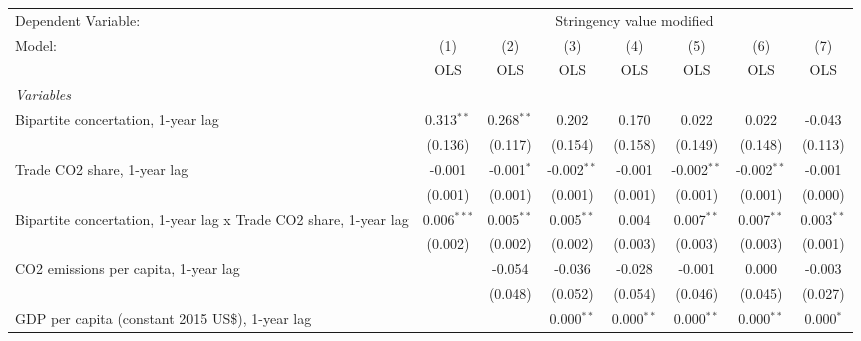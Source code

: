 
\begingroup
\centering
\begin{tabular}{lccccccc}
   \toprule
   Dependent Variable: & \multicolumn{7}{c}{Stringency value modified}\\
   Model:                                                           & (1)           & (2)          & (3)           & (4)          & (5)           & (6)           & (7)\\  
                                                                    &  OLS          & OLS          & OLS           & OLS          & OLS           & OLS           & OLS\\  
   \midrule
   \emph{Variables}\\
   Bipartite concertation, 1-year lag                               & 0.313$^{**}$  & 0.268$^{**}$ & 0.202         & 0.170        & 0.022         & 0.022         & -0.043\\   
                                                                    & (0.136)       & (0.117)      & (0.154)       & (0.158)      & (0.149)       & (0.148)       & (0.113)\\   
   Trade CO2 share, 1-year lag                                      & -0.001        & -0.001$^{*}$ & -0.002$^{**}$ & -0.001       & -0.002$^{**}$ & -0.002$^{**}$ & -0.001\\   
                                                                    & (0.001)       & (0.001)      & (0.001)       & (0.001)      & (0.001)       & (0.001)       & (0.000)\\   
   Bipartite concertation, 1-year lag x Trade CO2 share, 1-year lag & 0.006$^{***}$ & 0.005$^{**}$ & 0.005$^{**}$  & 0.004        & 0.007$^{**}$  & 0.007$^{**}$  & 0.003$^{**}$\\   
                                                                    & (0.002)       & (0.002)      & (0.002)       & (0.003)      & (0.003)       & (0.003)       & (0.001)\\   
   CO2 emissions per capita, 1-year lag                             &               & -0.054       & -0.036        & -0.028       & -0.001        & 0.000         & -0.003\\   
                                                                    &               & (0.048)      & (0.052)       & (0.054)      & (0.046)       & (0.045)       & (0.027)\\   
   GDP per capita (constant 2015 US\$), 1-year lag                  &               &              & 0.000$^{**}$  & 0.000$^{**}$ & 0.000$^{**}$  & 0.000$^{**}$  & 0.000$^{*}$\\   

\end{tabular}
